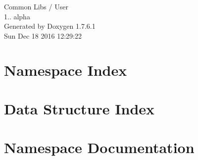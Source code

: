 \documentclass[a4paper]{book}
\begin{document}
\hypersetup{pageanchor=false,citecolor=blue}
\begin{titlepage}
\vspace*{7cm}
\begin{center}
{\Large \-Common \-Libs / \-User \\[1ex]\large 1.. alpha }\\
\vspace*{1cm}
{\large \-Generated by Doxygen 1.7.6.1}\\
\vspace*{0.5cm}
{\small Sun Dec 18 2016 12:29:22}\\
\end{center}
\end{titlepage}
\clearemptydoublepage
{}
\tableofcontents
\clearemptydoublepage
{}
\hypersetup{pageanchor=true,citecolor=blue}
\chapter{\-Namespace \-Index}

\chapter{\-Data \-Structure \-Index}

\chapter{\-Namespace \-Documentation}



\end{document}
